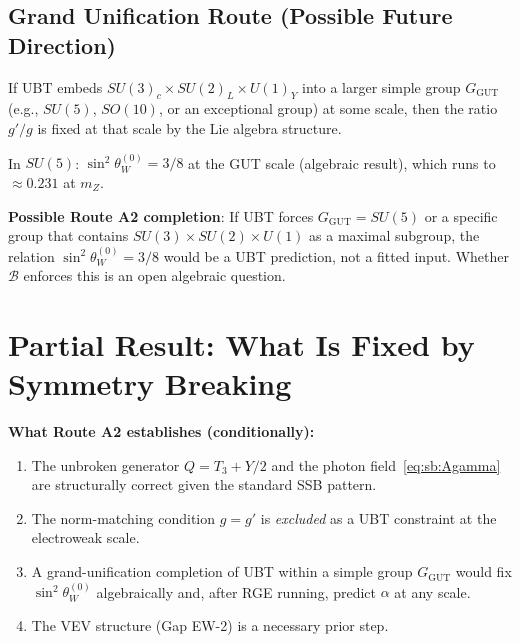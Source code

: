 \documentclass[12pt,a4paper]{article}
\theoremstyle{definition}
\theoremstyle{remark}
\begin{document}
\subsection{Grand Unification Route (Possible Future Direction)}

If UBT embeds $SU(3)_c \times SU(2)_L \times U(1)_Y$ into a larger simple group
$G_{\mathrm{GUT}}$ (e.g., $SU(5)$, $SO(10)$, or an exceptional group) at some scale,
then the ratio $g'/g$ is fixed at that scale by the Lie algebra structure.

In $SU(5)$: $\sin^2\theta_W^{(0)} = 3/8$ at the GUT scale (algebraic result), which
runs to $\approx 0.231$ at $m_Z$.

\begin{insightbox}
\textbf{Possible Route A2 completion}: If UBT forces $G_{\mathrm{GUT}} = SU(5)$ or
a specific group that contains $SU(3) \times SU(2) \times U(1)$ as a maximal
subgroup, the relation $\sin^2\theta_W^{(0)} = 3/8$ would be a UBT prediction,
not a fitted input.  Whether $\mathcal{B}$ enforces this is an open algebraic question.
\end{insightbox}

\section{Partial Result: What Is Fixed by Symmetry Breaking}
\label{sec:sb:partial}

\begin{resultbox}
\textbf{What Route A2 establishes (conditionally):}
\begin{enumerate}
  \item The unbroken generator $Q = T_3 + Y/2$ and the photon field~\eqref{eq:sb:Agamma}
        are structurally correct given the standard SSB pattern.
  \item The norm-matching condition $g = g'$ is \emph{excluded} as a UBT constraint
        at the electroweak scale.
  \item A grand-unification completion of UBT within a simple group $G_{\mathrm{GUT}}$
        would fix $\sin^2\theta_W^{(0)}$ algebraically and, after RGE running,
        predict $\alpha$ at any scale.
  \item The VEV structure (Gap EW-2) is a necessary prior step.
\end{enumerate}
\end{resultbox}
\end{document}
